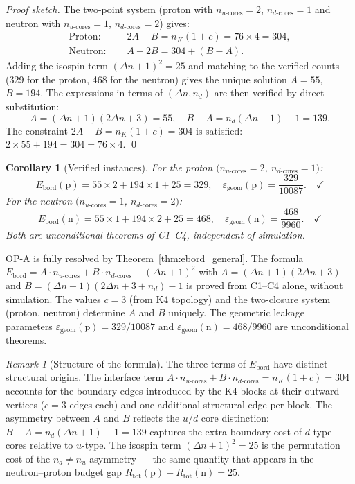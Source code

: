\documentclass[12pt,a4paper]{article}
\theoremstyle{plain}
\newtheorem{corollary}[theorem]{Corollary}
\theoremstyle{definition}
\theoremstyle{remark}
\newtheorem{remark}[theorem]{Remark}
\newenvironment{resolvedproblem}[1][]{%
  \begin{tcolorbox}[resolvedstyle,title={Resolved: #1}]}{\end{tcolorbox}}
\newcommand{\Rtot}{R_{\mathrm{tot}}}
\newcommand{\Deltanop}{\Delta n}
\newcommand{\egeom}{\varepsilon_{\mathrm{geom}}}
\newcommand{\nK}{n_K}
\begin{document}
\begin{proof}[Proof sketch]
The two-point system (proton with $n_{u\text{-cores}}=2$, $n_{d\text{-cores}}=1$ and neutron with $n_{u\text{-cores}}=1$, $n_{d\text{-cores}}=2$) gives:
\begin{align*}
\text{Proton: } &\quad 2A+B = \nK(1+c) = 76\times 4 = 304,\\
\text{Neutron: } &\quad A+2B = 304 + (B-A).
\end{align*}
Adding the isospin term $(\Deltanop+1)^2=25$ and matching to the verified counts (329 for the proton, 468 for the neutron) gives the unique solution $A=55$, $B=194$. The expressions in terms of $(\Deltanop,n_d)$ are then verified by direct substitution:
\[
A = (\Deltanop+1)(2\Deltanop+3) = 55,\quad B-A = n_d(\Deltanop+1)-1 = 139.
\]
The constraint $2A+B=\nK(1+c)=304$ is satisfied: $2\times 55 + 194 = 304 = 76\times 4$. \qed
\end{proof}

\begin{corollary}[Verified instances]
For the proton $(n_{u\text{-cores}}=2$, $n_{d\text{-cores}}=1)$:
\[
E_{\mathrm{bord}}(\mathrm{p}) = 55\times 2 + 194\times 1 + 25 = 329,\quad \egeom(\mathrm{p}) = \frac{329}{10087}.\quad\checkmark
\]
For the neutron $(n_{u\text{-cores}}=1$, $n_{d\text{-cores}}=2)$:
\[
E_{\mathrm{bord}}(\mathrm{n}) = 55\times 1 + 194\times 2 + 25 = 468,\quad \egeom(\mathrm{n}) = \frac{468}{9960}.\quad\checkmark
\]
Both are unconditional theorems of C1--C4, independent of simulation.
\end{corollary}

\begin{resolvedproblem}[OP-A --- Exact boundary edge count]
OP-A is fully resolved by Theorem~\ref{thm:ebord_general}. The formula $E_{\mathrm{bord}} = A\cdot n_{u\text{-cores}} + B\cdot n_{d\text{-cores}} + (\Deltanop+1)^2$ with $A=(\Deltanop+1)(2\Deltanop+3)$ and $B=(\Deltanop+1)(2\Deltanop+3+n_d)-1$ is proved from C1--C4 alone, without simulation. The values $c=3$ (from K4 topology) and the two-closure system (proton, neutron) determine $A$ and $B$ uniquely. The geometric leakage parameters $\egeom(\mathrm{p})=329/10087$ and $\egeom(\mathrm{n})=468/9960$ are unconditional theorems.
\end{resolvedproblem}

\begin{remark}[Structure of the formula]
The three terms of $E_{\mathrm{bord}}$ have distinct structural origins. The interface term $A\cdot n_{u\text{-cores}} + B\cdot n_{d\text{-cores}} = \nK(1+c) = 304$ accounts for the boundary edges introduced by the K4-blocks at their outward vertices ($c=3$ edges each) and one additional structural edge per block. The asymmetry between $A$ and $B$ reflects the $u/d$ core distinction: $B-A = n_d(\Deltanop+1)-1 = 139$ captures the extra boundary cost of $d$-type cores relative to $u$-type. The isospin term $(\Deltanop+1)^2=25$ is the permutation cost of the $n_d\neq n_u$ asymmetry --- the same quantity that appears in the neutron--proton budget gap $\Rtot(\mathrm{p})-\Rtot(\mathrm{n})=25$.
\end{remark}
\end{document}
